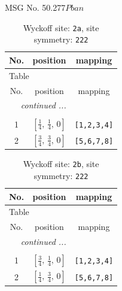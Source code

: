 \documentclass[fleqn,8pt]{jsarticle}
\begin{document}
\setcounter{MaxMatrixCols}{32}

\renewcommand{\tablename}{Table~}
\renewcommand{\figurename}{Figure~}
\begin{center}
\LARGE
MSG No. 50.277\quad$Pban$
\end{center}
\renewcommand{\arraystretch}{1.2}
\begin{longtable}{ccc}
\caption{Wyckoff site: {\tt 2a}, site symmetry: {\tt 222}}
 \\
 \hline \hline
No. & position & mapping \\ \hline \endfirsthead

\multicolumn{2}{l}{\tablename\ \thetable{}} \\
 \hline \hline
No. & position & mapping \\ \hline \endhead

 \hline \hline
\multicolumn{2}{r}{\footnotesize\it continued ...} \\ \endfoot

 \hline \hline
\multicolumn{2}{r}{} \\ \endlastfoot

1 & $\left[ \frac{1}{4},\, \frac{1}{4},\, 0 \right]$ & {\tt [1,2,3,4]} \\ \hline
2 & $\left[ \frac{3}{4},\, \frac{3}{4},\, 0 \right]$ & {\tt [5,6,7,8]} \\
\end{longtable}
\renewcommand{\arraystretch}{1.2}
\begin{longtable}{ccc}
\caption{Wyckoff site: {\tt 2b}, site symmetry: {\tt 222}}
 \\
 \hline \hline
No. & position & mapping \\ \hline \endfirsthead

\multicolumn{2}{l}{\tablename\ \thetable{}} \\
 \hline \hline
No. & position & mapping \\ \hline \endhead

 \hline \hline
\multicolumn{2}{r}{\footnotesize\it continued ...} \\ \endfoot

 \hline \hline
\multicolumn{2}{r}{} \\ \endlastfoot

1 & $\left[ \frac{3}{4},\, \frac{1}{4},\, 0 \right]$ & {\tt [1,2,3,4]} \\ \hline
2 & $\left[ \frac{1}{4},\, \frac{3}{4},\, 0 \right]$ & {\tt [5,6,7,8]} \\
\end{longtable}
\end{document}
